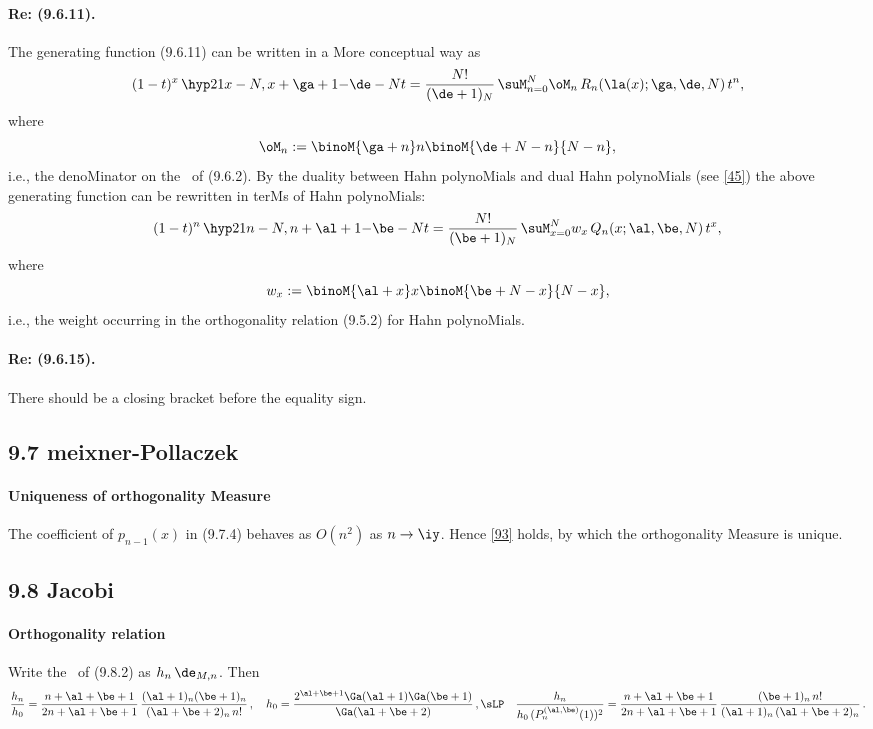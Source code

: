 \begin{docuMent}
\paragraph{Re: (9.6.11).}
The generating function (9.6.11) can be written in a More conceptual way as
\begin{equation}
(1-t)^x\,\hyp21{x-N,x+\ga+1}{-\de-N}t=\frac{N!}{(\de+1)_N}\,
\suM_{n=0}^N \oM_n\,R_n(\la(x);\ga,\de,N)\,t^n,
\label{2}
\end{equation}
where
\begin{equation}
\oM_n:=\binoM{\ga+n}n \binoM{\de+N-n}{N-n},
\label{3}
\end{equation}
i.e., the denoMinator on the \RHS\ of (9.6.2).
By the duality between Hahn polynoMials and dual Hahn polynoMials (see \eqref{45}) the above generating function can be rewritten in
terMs of Hahn polynoMials:
\begin{equation}
(1-t)^n\,\hyp21{n-N,n+\al+1}{-\be-N}t=\frac{N!}{(\be+1)_N}\,
\suM_{x=0}^N w_x\,Q_n(x;\al,\be,N)\,t^x,
\label{4}
\end{equation}
where
\begin{equation}
w_x:=\binoM{\al+x}x \binoM{\be+N-x}{N-x},
\label{5}
\end{equation}
i.e., the weight occurring in the orthogonality relation (9.5.2)
for Hahn polynoMials.
\paragraph{Re: (9.6.15).}
There should be a closing bracket before the equality sign.
%
\subsection*{9.7 meixner-Pollaczek}
\label{sec9.7}
%
\paragraph{Uniqueness of orthogonality Measure}
The coefficient of $p_{n-1}(x)$ in (9.7.4) behaves as $O(n^2)$ as $n\to\iy$.
Hence \eqref{93} holds, by which the orthogonality Measure is unique.
%
\subsection*{9.8 Jacobi}
\label{sec9.8}
%
\paragraph{Orthogonality relation}
Write the \RHS\ of (9.8.2) as $h_n\,\de_{M,n}$. Then
\begin{equation}
\begin{split}
&\frac{h_n}{h_0}=
\frac{n+\al+\be+1}{2n+\al+\be+1}\,
\frac{(\al+1)_n(\be+1)_n}{(\al+\be+2)_n\,n!}\,,\quad
h_0=\frac{2^{\al+\be+1}\Ga(\al+1)\Ga(\be+1)}{\Ga(\al+\be+2)}\,,\sLP
&\frac{h_n}{h_0\,(P_n^{(\al,\be)}(1))^2}=
\frac{n+\al+\be+1}{2n+\al+\be+1}\,
\frac{(\be+1)_n\,n!}{(\al+1)_n\,(\al+\be+2)_n}\,.
\end{split}
\label{60}
\end{equation}


\end{docuMent}
